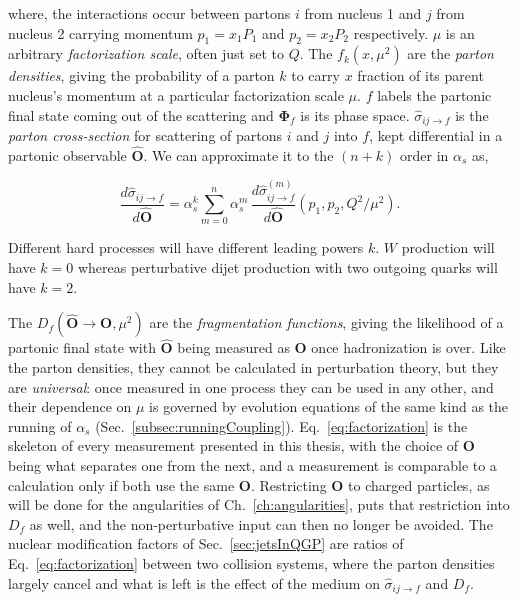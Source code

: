 where, the interactions occur between partons \(i\) from nucleus 1 and \(j\) from nucleus 2 carrying momentum \(p_1 = x_1P_1\) and \(p_2 = x_2P_2\) respectively. \(\mu\) is an arbitrary \emph{factorization scale}, often just set to \(Q\). The \(f_{k}(x, \mu^2)\) are the \emph{parton densities}, giving the probability of a parton \(k\) to carry \(x\) fraction of its parent nucleus's momentum at a particular factorization scale \(\mu\). \(f\) labels the partonic final state coming out of the scattering and \(\mathbf{\Phi}_f\) is its phase space. \(\hat{\sigma}_{ij\to f}\)  is the \emph{parton cross-section} for scattering of partons \(i\) and \(j\) into \(f\), kept differential in a partonic observable \(\hat{\mathbf{O}}\). We can approximate it to the \((n+k)\) order in \(\alpha_s\) as,

\begin{equation}
	\frac{d\hat{\sigma}_{ij\to f}}{d\hat{\mathbf{O}}} = \alpha_s^k \sum_{m=0}^{n}\alpha_s^m\,\frac{d\hat{\sigma}^{(m)}_{ij\to f}}{d\hat{\mathbf{O}}}(p_1, p_2, Q^2/\mu^2).
	\label{eq:partonXsecOrders}
\end{equation}

Different hard processes will have different leading powers \(k\). \(W\) production will have \(k=0\) whereas perturbative dijet production with two outgoing quarks will have \(k=2\).

The \(D_f(\hat{\mathbf{O}}\to\mathbf{O}, \mu^2)\) are the \emph{fragmentation functions}, giving the likelihood of a partonic final state with \(\hat{\mathbf{O}}\) being measured as \(\mathbf{O}\) once hadronization is over.
%
Like the parton densities, they cannot be calculated in perturbation theory, but they are \emph{universal}: once measured in one process they can be used in any other, and their dependence on \(\mu\) is governed by evolution equations of the same kind as the running of \(\alpha_s\) (Sec.~\ref{subsec:runningCoupling}).
%
Eq.~\ref{eq:factorization} is the skeleton of every measurement presented in this thesis, with the choice of \(\mathbf{O}\) being what separates one from the next, and a measurement is comparable to a calculation only if both use the same \(\mathbf{O}\).
%
Restricting \(\mathbf{O}\) to charged particles, as will be done for the angularities of Ch.~\ref{ch:angularities}, puts that restriction into \(D_f\) as well, and the non-perturbative input can then no longer be avoided.
%
The nuclear modification factors of Sec.~\ref{sec:jetsInQGP} are ratios of Eq.~\ref{eq:factorization} between two collision systems, where the parton densities largely cancel and what is left is the effect of the medium on \(\hat{\sigma}_{ij\to f}\) and \(D_f\).

